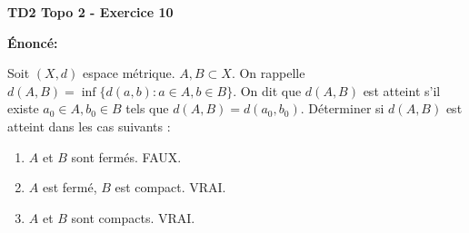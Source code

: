 \documentclass[oneside]{book}
\begin{document}
\textbf{TD2 Topo 2 - Exercice 10}

\textbf{Énoncé:}

Soit $(X, d)$ espace métrique. $A, B \subset X$. On rappelle $d(A, B) = \inf \{d(a, b) : a \in A, b \in B\}$.
On dit que $d(A, B)$ est atteint s'il existe $a_0 \in A, b_0 \in B$ tels que $d(A, B) = d(a_0, b_0)$.
Déterminer si $d(A, B)$ est atteint dans les cas suivants :

\begin{enumerate}
    \item $A$ et $B$ sont fermés. FAUX.

    \item $A$ est fermé, $B$ est compact. VRAI.

    \item $A$ et $B$ sont compacts. VRAI.
\end{enumerate}
\end{document}
